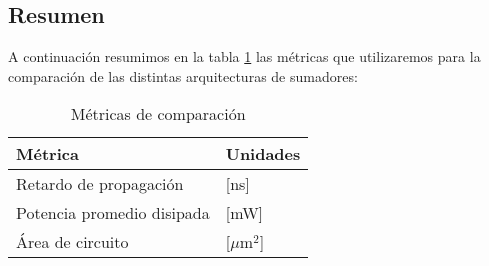 \subsection{Resumen}
A continuación resumimos en la tabla \ref{cuadro:metricas} las métricas que utilizaremos para la comparación de las distintas arquitecturas de sumadores:
\begin{table}[h] 
\centering
\begin{tabular}{@{}ll@{}}
\toprule
\textbf{Métrica}  & \textbf{Unidades} \\ \midrule
Retardo de propagación & [ns] \\	
Potencia promedio disipada & [mW] \\
Área de circuito  & [$\mu\textrm{m}^2$] \\ \bottomrule
\end{tabular}
\caption{Métricas de comparación}
\label{cuadro:metricas}
\end{table}














